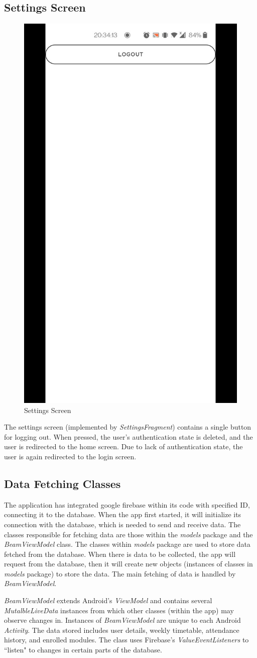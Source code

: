 \documentclass[../report.tex]{subfiles}
\begin{document}
\subsection{Settings Screen}

\begin{figure}[H]
	\centering
	\includegraphics[width=.28\linewidth]{../images/07/02-app-settings.jpg}
	\caption{Settings Screen}
	\label{fig:app-settings-screen}
\end{figure}
\pagebreak
The settings screen (implemented by \textit{SettingsFragment}) contains a single button for logging out. When pressed, the user’s authentication state is deleted, and the user is redirected to the home screen. Due to lack of authentication state, the user is again redirected to the login screen.



\subsection{Data Fetching Classes}
The application has integrated google firebase within its code with specified ID, connecting it to the database. When the app first started, it will initialize its connection with the database, which is needed to send and receive data. The classes responsible for fetching data are those within the \textit{models} package and the \textit{BeamViewModel} class. The classes within \textit{models} package are used to store data fetched from the database. When there is data to be collected, the app will request from the database, then it will create new objects (instances of classes in \textit{models} package) to store the data. The main fetching of data is handled by \textit{BeamViewModel}.

\textit{BeamViewModel} extends Android’s \textit{ViewModel} and contains several \textit{MutalbleLiveData} instances from which other classes (within the app) may observe changes in. Instances of \textit{BeamViewModel} are unique to each Android \textit{Activity}. The data stored includes user details, weekly timetable, attendance history, and enrolled modules. The class uses Firebase’s \textit{ValueEventListeners} to ``listen" to changes in certain parts of the database. 
\end{document}
